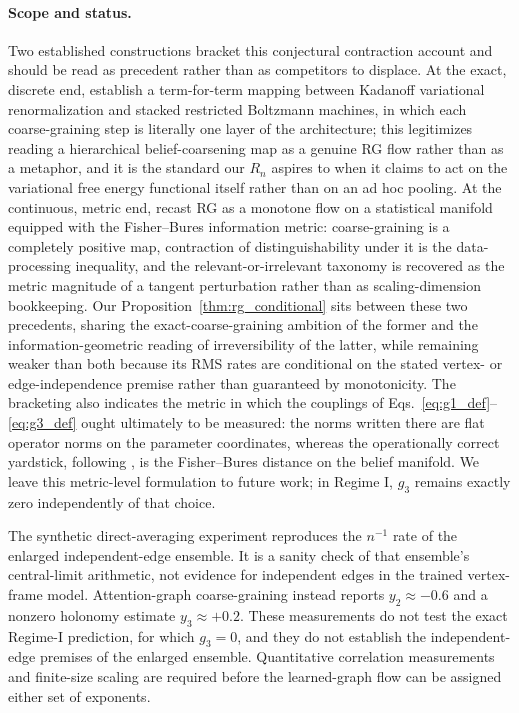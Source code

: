 \documentclass[twoside,11pt]{article}
\begin{document}
\paragraph{Scope and status.}
Two established constructions bracket this conjectural contraction account and should be read as precedent rather than as competitors to displace. At the exact, discrete end, \citet{mehta2014exact} establish a term-for-term mapping between Kadanoff variational renormalization and stacked restricted Boltzmann machines, in which each coarse-graining step is literally one layer of the architecture; this legitimizes reading a hierarchical belief-coarsening map as a genuine RG flow rather than as a metaphor, and it is the standard our $R_n$ aspires to when it claims to act on the variational free energy functional itself rather than on an ad hoc pooling. At the continuous, metric end, \citet{beny2015information} recast RG as a monotone flow on a statistical manifold equipped with the Fisher--Bures information metric: coarse-graining is a completely positive map, contraction of distinguishability under it is the data-processing inequality, and the relevant-or-irrelevant taxonomy is recovered as the metric magnitude of a tangent perturbation rather than as scaling-dimension bookkeeping. Our Proposition~\ref{thm:rg_conditional} sits between these two precedents, sharing the exact-coarse-graining ambition of the former and the information-geometric reading of irreversibility of the latter, while remaining weaker than both because its RMS rates are conditional on the stated vertex- or edge-independence premise rather than guaranteed by monotonicity. The bracketing also indicates the metric in which the couplings of Eqs.~\eqref{eq:g1_def}--\eqref{eq:g3_def} ought ultimately to be measured: the norms written there are flat operator norms on the parameter coordinates, whereas the operationally correct yardstick, following \citet{beny2015information}, is the Fisher--Bures distance on the belief manifold. We leave this metric-level formulation to future work; in Regime I, $g_3$ remains exactly zero independently of that choice.

The synthetic direct-averaging experiment reproduces the $n^{-1}$ rate of the enlarged independent-edge ensemble. It is a sanity check of that ensemble's central-limit arithmetic, not evidence for independent edges in the trained vertex-frame model. Attention-graph coarse-graining instead reports $y_2\approx-0.6$ and a nonzero holonomy estimate $y_3\approx+0.2$. These measurements do not test the exact Regime-I prediction, for which $g_3=0$, and they do not establish the independent-edge premises of the enlarged ensemble. Quantitative correlation measurements and finite-size scaling are required before the learned-graph flow can be assigned either set of exponents.
\end{document}
